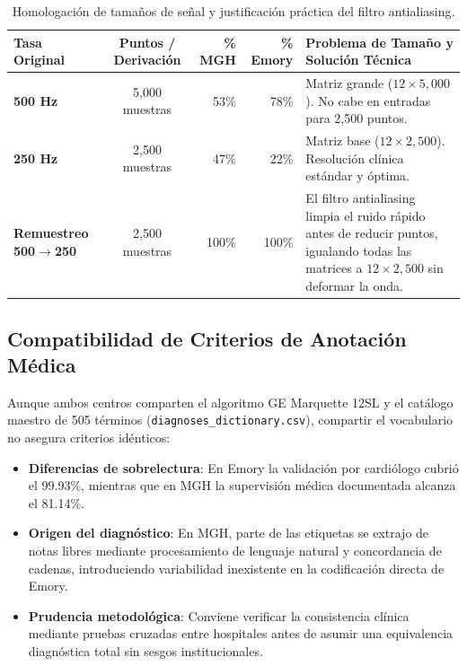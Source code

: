 \documentclass[11pt,a4paper]{article}
\begin{document}
\begin{table}[htbp]
\centering
\small
\renewcommand{\arraystretch}{1.18}
\begin{tabularx}{\textwidth}{@{} l c rr X @{}}
\toprule
\textbf{Tasa Original} & \textbf{Puntos / Derivación} & \textbf{\% MGH} & \textbf{\% Emory} & \textbf{Problema de Tamaño y Solución Técnica} \\
\midrule
\textbf{500 Hz} & 5,000 muestras & 53\% & 78\% & Matriz grande ($12 \times 5{,}000$). No cabe en entradas para 2,500 puntos. \\
\textbf{250 Hz} & 2,500 muestras & 47\% & 22\% & Matriz base ($12 \times 2{,}500$). Resolución clínica estándar y óptima. \\
\midrule
\textbf{Remuestreo 500$\rightarrow$250} & 2,500 muestras & 100\% & 100\% & El filtro antialiasing limpia el ruido rápido antes de reducir puntos, igualando todas las matrices a $12 \times 2{,}500$ sin deformar la onda. \\
\bottomrule
\end{tabularx}
\caption{Homologación de tamaños de señal y justificación práctica del filtro antialiasing.}
\label{tab:remuestreo}
\end{table}

\subsection{Compatibilidad de Criterios de Anotación Médica}
Aunque ambos centros comparten el algoritmo GE Marquette 12SL y el catálogo maestro de 505 términos (\nolinkurl{diagnoses_dictionary.csv}), compartir el vocabulario no asegura criterios idénticos:
\begin{itemize}[topsep=1pt, itemsep=1pt, parsep=0pt]
    \item \textbf{Diferencias de sobrelectura}: En Emory la validación por cardiólogo cubrió el 99.93\%, mientras que en MGH la supervisión médica documentada alcanza el 81.14\%.
    \item \textbf{Origen del diagnóstico}: En MGH, parte de las etiquetas se extrajo de notas libres mediante procesamiento de lenguaje natural y concordancia de cadenas, introduciendo variabilidad inexistente en la codificación directa de Emory.
    \item \textbf{Prudencia metodológica}: Conviene verificar la consistencia clínica mediante pruebas cruzadas entre hospitales antes de asumir una equivalencia diagnóstica total sin sesgos institucionales.
\end{itemize}
\newpage
\end{document}
